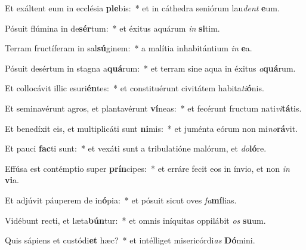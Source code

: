 \item Et exáltent eum in ecclésia \textbf{ple}bis:~* et in cáthedra seniórum lau\textit{dent} \textbf{e}um.
\item Pósuit flúmina in de\textbf{sér}tum:~* et éxitus aquárum \textit{in} \textbf{si}tim.
\item Terram fructíferam in sal\textbf{sú}ginem:~* a malítia inhabitántium \textit{in} \textbf{e}a.
\item Pósuit desértum in stagna a\textbf{quá}rum:~* et terram sine aqua in éxitus \textit{a}\textbf{quá}rum.
\item Et collocávit illic esuri\textbf{én}tes:~* et constituérunt civitátem habita\textit{ti}\textbf{ó}nis.
\item Et seminavérunt agros, et plantavérunt \textbf{ví}neas:~* et fecérunt fructum nati\textit{vi}\textbf{tá}tis.
\item Et benedíxit eis, et multiplicáti sunt \textbf{ni}mis:~* et juménta eórum non mi\textit{no}\textbf{rá}vit.
\item Et pauci \textbf{fac}ti sunt:~* et vexáti sunt a tribulatióne malórum, et \textit{do}\textbf{ló}re.
\item Effúsa est contémptio super \textbf{prín}cipes:~* et erráre fecit eos in ínvio, et non \textit{in} \textbf{vi}a.
\item Et adjúvit páuperem de in\textbf{ó}pia:~* et pósuit sicut oves \textit{fa}\textbf{mí}lias.
\item Vidébunt recti, et læta\textbf{bún}tur:~* et omnis iníquitas oppilábit \textit{os} \textbf{su}um.
\item Quis sápiens et custódi\textbf{et} hæc?~* et intélliget misericórdi\textit{as} \textbf{Dó}mini.
